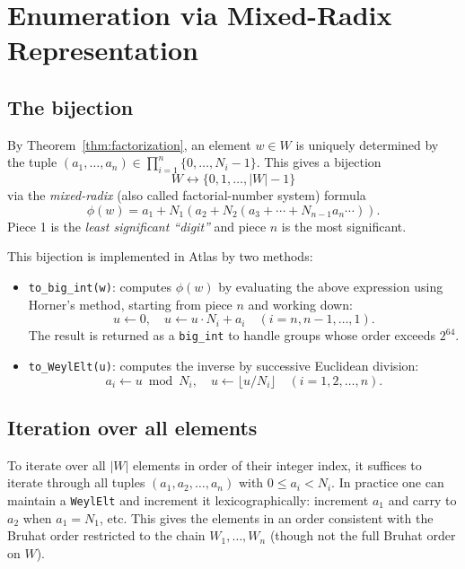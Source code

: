 \documentclass[12pt]{amsart}
\begin{document}
\section{Enumeration via Mixed-Radix Representation}

\subsection{The bijection}

By Theorem~\ref{thm:factorization}, an element $w \in W$ is uniquely
determined by the tuple $(a_1, \ldots, a_n) \in \prod_{i=1}^n \{0, \ldots,
N_i - 1\}$.  This gives a bijection
\[
  W \leftrightarrow \{0, 1, \ldots, |W| - 1\}
\]
via the \emph{mixed-radix} (also called factorial-number system) formula
\[
  \phi(w) = a_1 + N_1 (a_2 + N_2 (a_3 + \cdots + N_{n-1} a_n \cdots)).
\]
Piece 1 is the \emph{least significant ``digit''} and piece $n$ is the most
significant.

This bijection is implemented in Atlas by two methods:
\begin{itemize}
  \item \texttt{to\_big\_int(w)}: computes $\phi(w)$ by evaluating the
    above expression using Horner's method, starting from piece $n$ and
    working down:
    \[
      u \leftarrow 0, \quad
      u \leftarrow u \cdot N_i + a_i \quad (i = n, n-1, \ldots, 1).
    \]
    The result is returned as a \texttt{big\_int} to handle groups whose order
    exceeds $2^{64}$.
  \item \texttt{to\_WeylElt(u)}: computes the inverse by successive Euclidean
    division:
    \[
      a_i \leftarrow u \bmod N_i, \quad u \leftarrow \lfloor u / N_i \rfloor
      \quad (i = 1, 2, \ldots, n).
    \]
\end{itemize}

\subsection{Iteration over all elements}

To iterate over all $|W|$ elements in order of their integer index, it
suffices to iterate through all tuples
$(a_1, a_2, \ldots, a_n)$ with $0 \leq a_i < N_i$.  In practice one can
maintain a \texttt{WeylElt} and increment it lexicographically: increment $a_1$
and carry to $a_2$ when $a_1 = N_1$, etc.  This gives the elements in an order
consistent with the Bruhat order restricted to the chain $W_1, \ldots, W_n$
(though not the full Bruhat order on $W$).
\end{document}
